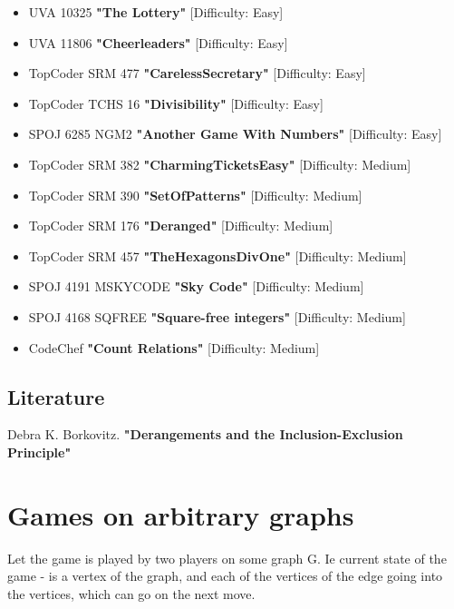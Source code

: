 \begin{itemize}
\item UVA 10325 \textbf{"The Lottery"} [Difficulty: Easy]

\item UVA 11806 \textbf{"Cheerleaders"} [Difficulty: Easy]

\item TopCoder SRM 477 \textbf{"CarelessSecretary"} [Difficulty: Easy]

\item TopCoder TCHS 16 \textbf{"Divisibility"} [Difficulty: Easy]

\item SPOJ 6285 NGM2 \textbf{"Another Game With Numbers"} [Difficulty: Easy]

\item TopCoder SRM 382 \textbf{"CharmingTicketsEasy"} [Difficulty: Medium]

\item TopCoder SRM 390 \textbf{"SetOfPatterns"} [Difficulty: Medium]

\item TopCoder SRM 176 \textbf{"Deranged"} [Difficulty: Medium]

\item TopCoder SRM 457 \textbf{"TheHexagonsDivOne"} [Difficulty: Medium]

\item SPOJ 4191 MSKYCODE \textbf{"Sky Code"} [Difficulty: Medium]

\item SPOJ 4168 SQFREE \textbf{"Square-free integers"} [Difficulty: Medium]

\item CodeChef \textbf{"Count Relations"} [Difficulty: Medium]
\end{itemize}

\subsection{ Literature }

Debra K. Borkovitz. \textbf{"Derangements and the Inclusion-Exclusion Principle"}

\section{ Games on arbitrary graphs }
Let the game is played by two players on some graph G. Ie current state of the game - is a vertex of the graph, and each of the vertices of the edge going into the vertices, which can go on the next move.

